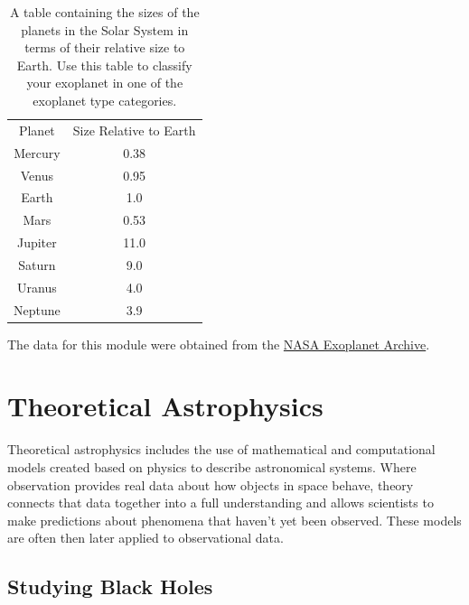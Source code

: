 \documentclass[14pt]{article}
\newcommand\kw[1]{{\color{teal}#1}}
\begin{document}
\begin{table}[h]
\centering
\begin{tabular}{|c|c|}
\hline
Planet  & Size Relative to Earth \\ \hhline{|=|=|}
Mercury &   0.38   \\ \hline
Venus   &   0.95   \\ \hline
Earth   &   1.0    \\ \hline
Mars    &   0.53   \\ \hline
Jupiter &   11.0   \\ \hline
Saturn  &   9.0    \\ \hline
Uranus  &   4.0    \\ \hline
Neptune &   3.9    \\ \hline
\end{tabular}
\label{tab:sizes}
\caption{A table containing the sizes of the planets in the Solar System in terms of their relative size to Earth. Use this table to classify your exoplanet in one of the exoplanet type categories.}
\end{table}

\noindent The data for this module were obtained from the \href{https://exoplanetarchive.ipac.caltech.edu/overview/kepler-695b}{NASA Exoplanet Archive}.

\clearpage

\section{Theoretical Astrophysics}


Theoretical astrophysics includes the use of mathematical and computational models created based on physics to describe astronomical systems. Where observation provides real data about how objects in space behave, theory connects that data together into a full understanding and allows scientists to make predictions about phenomena that haven’t yet been observed. These models are often then later applied to observational data.

\subsection{Studying Black Holes}
\end{document}
